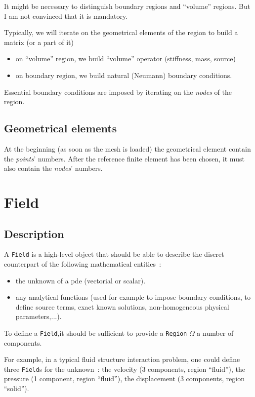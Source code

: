 \documentclass{article}
\begin{document}
It might be necessary to distinguish boundary regions and 
``volume'' regions. But I am not convinced that it is mandatory.

Typically, we will iterate on the geometrical elements of the region
to build a matrix (or a part of it)
\begin{itemize}
\item on ``volume'' region, we build ``volume'' operator
(stiffness, mass, source)
\item on boundary region, we build natural (Neumann) boundary conditions.
\end{itemize}

Essential boundary conditions are imposed by iterating on the \textit{nodes} of
the region.

\subsection{Geometrical elements}
At the beginning (as soon as the mesh is loaded) the geometrical 
element contain the \textit{points}' numbers. After the reference finite 
element has been chosen, it must also contain the \textit{nodes}' numbers. 

\section{Field}

\subsection{Description}
A \texttt{Field} is a high-level object that should be able to describe 
the discret counterpart of the following mathematical entities~:
\begin{itemize}
\item the unknown of a pde (vectorial or scalar).
\item any analytical functions (used for example to impose boundary
  conditions, to define source terms, exact known solutions, 
  non-homogeneous physical parameters,...).
\end{itemize}

To define a \texttt{Field},it should be sufficient to provide a
\texttt{Region} $\Omega$ a number of components.

For example, in a typical fluid structure interaction problem, one could
define three \texttt{Field}s for the unknown~: the velocity (3
components, region ``fluid''), the pressure (1
component, region ``fluid''), the displacement (3
components, region ``solid'').
\end{document}
